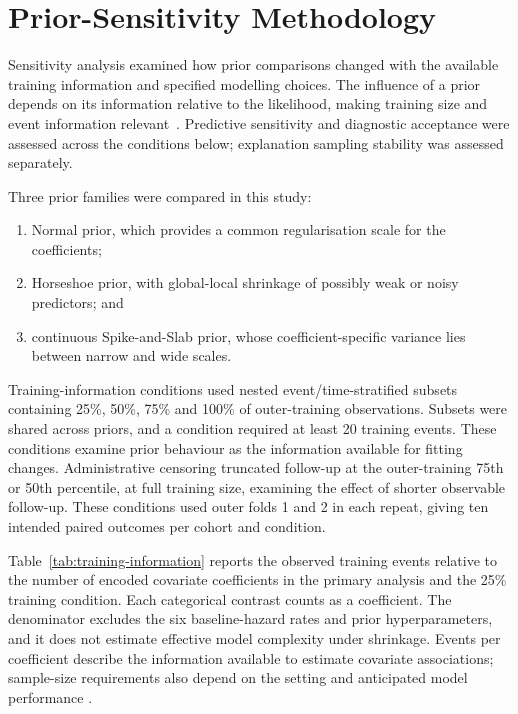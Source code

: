 \section{Prior-Sensitivity Methodology}\label{prior-sensitivity-methodology}

Sensitivity analysis examined how prior comparisons changed with the available training information and specified modelling choices. The influence of a prior depends on its information relative to the likelihood, making training size and event information relevant~\cite{ref40,ref56}. Predictive sensitivity and diagnostic acceptance were assessed across the conditions below; explanation sampling stability was assessed separately.

Three prior families were compared in this study:

\begin{enumerate}
\def\labelenumi{\arabic{enumi}.}
\item
  Normal prior, which provides a common regularisation scale for the coefficients;
\item
  Horseshoe prior, with global-local shrinkage of possibly weak or noisy predictors; and
\item
  continuous Spike-and-Slab prior, whose coefficient-specific variance lies between narrow and wide scales.
\end{enumerate}

Training-information conditions used nested event/time-stratified subsets containing 25\%, 50\%, 75\% and 100\% of outer-training observations. Subsets were shared across priors, and a condition required at least 20 training events. These conditions examine prior behaviour as the information available for fitting changes. Administrative censoring truncated follow-up at the outer-training 75th or 50th percentile, at full training size, examining the effect of shorter observable follow-up. These conditions used outer folds 1 and 2 in each repeat, giving ten intended paired outcomes per cohort and condition.

Table~\ref{tab:training-information} reports the observed training events relative to the number of encoded covariate coefficients in the primary analysis and the 25\% training condition. Each categorical contrast counts as a coefficient. The denominator excludes the six baseline-hazard rates and prior hyperparameters, and it does not estimate effective model complexity under shrinkage. Events per coefficient describe the information available to estimate covariate associations; sample-size requirements also depend on the setting and anticipated model performance \cite{riley2019samplesize}.

